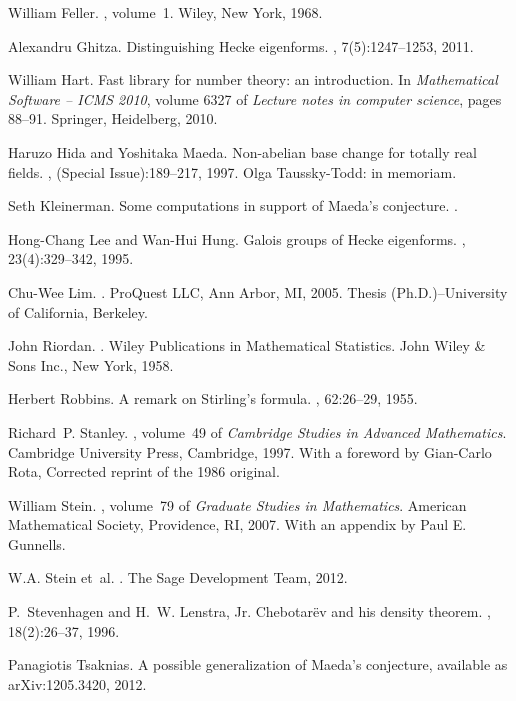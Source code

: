 \documentclass{book}
\begin{document}
\begin{thebibliography}{10}
William Feller.
,
  volume~1.
\newblock Wiley, New York, 1968.

Alexandru Ghitza.
\newblock Distinguishing {H}ecke eigenforms.
, 7(5):1247--1253, 2011.

William Hart.
\newblock Fast library for number theory: an introduction.
\newblock In {\em Mathematical Software -- ICMS 2010}, volume 6327 of {\em
  Lecture notes in computer science}, pages 88--91. Springer, Heidelberg, 2010.

Haruzo Hida and Yoshitaka Maeda.
\newblock Non-abelian base change for totally real fields.
, (Special Issue):189--217, 1997.
\newblock Olga Taussky-Todd: in memoriam.

Seth Kleinerman.
\newblock Some computations in support of {M}aeda's conjecture.
.

Hong-Chang Lee and Wan-Hui Hung.
\newblock Galois groups of {H}ecke eigenforms.
, 23(4):329--342, 1995.

Chu-Wee Lim.
.
\newblock ProQuest LLC, Ann Arbor, MI, 2005.
\newblock Thesis (Ph.D.)--University of California, Berkeley.

John Riordan.
.
\newblock Wiley Publications in Mathematical Statistics. John Wiley \& Sons
  Inc., New York, 1958.

Herbert Robbins.
\newblock A remark on {S}tirling's formula.
, 62:26--29, 1955.

Richard~P. Stanley.
, volume~49 of {\em
  Cambridge Studies in Advanced Mathematics}.
\newblock Cambridge University Press, Cambridge, 1997.
\newblock With a foreword by Gian-Carlo Rota, Corrected reprint of the 1986
  original.

William Stein.
, volume~79 of {\em
  Graduate Studies in Mathematics}.
\newblock American Mathematical Society, Providence, RI, 2007.
\newblock With an appendix by Paul E. Gunnells.

W.\thinspace{}A. Stein et~al.
.
\newblock The Sage Development Team, 2012.

P.~Stevenhagen and H.~W. Lenstra, Jr.
\newblock Chebotar\"ev and his density theorem.
, 18(2):26--37, 1996.

Panagiotis Tsaknias.
\newblock A possible generalization of {M}aeda's conjecture,
\newblock available as arXiv:1205.3420, 2012.

\end{thebibliography}
\end{document}
